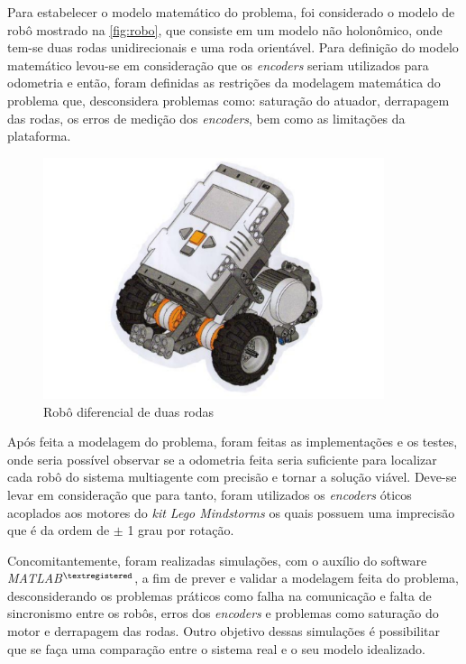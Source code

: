 Para estabelecer o modelo matemático do problema, foi considerado o modelo de robô mostrado na \autoref{fig:robo}, que consiste em um modelo não holonômico, onde tem-se duas rodas unidirecionais e uma roda orientável. Para definição do modelo matemático levou-se em consideração que os \emph{encoders} seriam utilizados para odometria e então, foram definidas as restrições da modelagem matemática do problema que, desconsidera problemas como: saturação do atuador, derrapagem das rodas, os erros de medição dos \emph{encoders}, bem como as limitações da plataforma. %

\begin{figure}[!htb]
	\centering
	\includegraphics[width=10cm]{./04-figuras/robo}
	\caption{Robô diferencial de duas rodas}
	\label{fig:robo}
\end{figure}

Após feita a modelagem do problema, foram feitas as implementações e os testes, onde seria possível observar se a odometria feita seria suficiente para localizar cada robô do sistema multiagente com precisão e tornar a solução viável. Deve-se levar em consideração que para tanto, foram utilizados os \emph{encoders} óticos acoplados aos motores do \emph{kit Lego Mindstorms\textregistered} os quais possuem uma imprecisão que é da ordem de $\pm$ 1 grau por rotação. 

Concomitantemente, foram realizadas simulações, com o auxílio do software \emph{MATLAB$^{\textregistered}$}, a fim de prever e validar a modelagem feita do problema, desconsiderando os problemas práticos como falha na comunicação e falta de sincronismo entre os robôs, erros dos \emph{encoders} e problemas como saturação do motor e derrapagem das rodas. Outro objetivo dessas simulações é possibilitar que se faça uma comparação entre o sistema real e o seu modelo idealizado.

